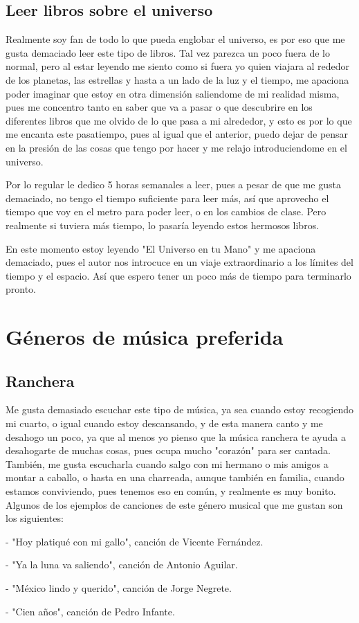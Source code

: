 \documentclass[letterpaper,12pt]{article}
\begin{document}
    \subsection{\Large{Leer libros sobre el universo}} \large{Realmente soy fan de todo lo que pueda englobar el universo, es por eso que me gusta demaciado leer este tipo de libros. Tal vez parezca un poco fuera de lo normal, pero al estar leyendo me siento como si fuera yo quien viajara al rededor de los planetas, las estrellas y hasta a un lado de la luz y el tiempo, me apaciona poder imaginar que estoy en otra dimensión saliendome de mi realidad misma, pues me concentro tanto en saber que va a pasar o que descubrire en los diferentes libros que me olvido de lo que pasa a mi alrededor, y esto es por lo que me encanta este pasatiempo, pues al igual que el anterior, puedo dejar de pensar en la presión de las cosas que tengo por hacer y me relajo introduciendome en el universo.
    
    Por lo regular le dedico 5 horas semanales a leer, pues a pesar de que me gusta demaciado, no tengo el tiempo suficiente para leer más, así que aprovecho el tiempo que voy en el metro para poder leer, o en los cambios de clase. Pero realmente si tuviera más tiempo, lo pasaría leyendo estos hermosos libros. 
    
    En este momento estoy leyendo "El Universo en tu Mano" y me apaciona demaciado, pues el autor nos introcuce en un viaje extraordinario a los límites del tiempo y el espacio. Así que espero tener un poco más de tiempo para terminarlo pronto.}
    
\section{\huge{Géneros de música preferida}}
    \subsection{\Large{Ranchera}} \large{Me gusta demasiado escuchar este tipo de música, ya sea cuando estoy recogiendo mi cuarto, o igual cuando estoy descansando, y de esta manera canto y me desahogo un poco, ya que al menos yo pienso que la música ranchera te ayuda a desahogarte de muchas cosas, pues ocupa mucho "corazón" para ser cantada. También, me gusta escucharla cuando salgo con mi hermano o mis amigos a montar a caballo, o hasta en una charreada, aunque también en familia, cuando estamos conviviendo, pues tenemos eso en común, y realmente es muy bonito. Algunos de los ejemplos de canciones de este género musical que me gustan son los siguientes:
    
    - "Hoy platiqué con mi gallo", canción de Vicente Fernández.
    
    - "Ya la luna va saliendo", canción de Antonio Aguilar.
    
    - "México lindo y querido", canción de Jorge Negrete.
    
    - "Cien años", canción de Pedro Infante.}
\end{document}
